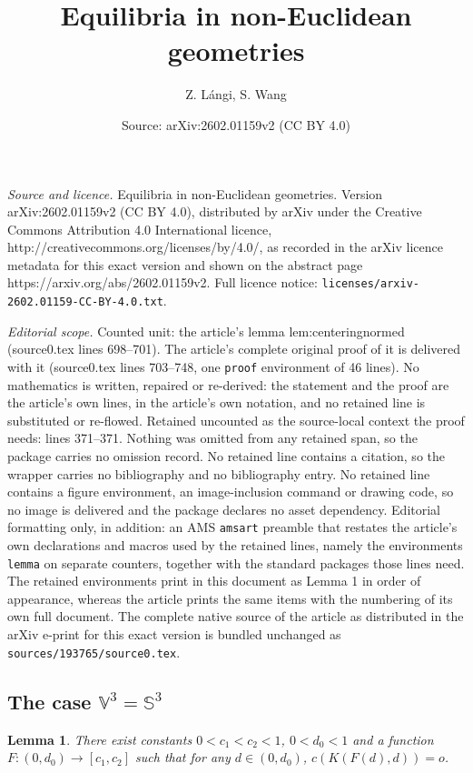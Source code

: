 \documentclass[10pt,a4paper]{amsart}
\title{Equilibria in non-Euclidean geometries}
\author{Z. L\'angi, S. Wang}
\date{Source: arXiv:2602.01159v2 (CC BY 4.0)}
\newtheorem{lemma}{Lemma}
\newcommand{\Sph}{\mathbb{S}}
\newcommand{\V}{\mathbb{V}}
\begin{document}
\maketitle

\noindent\emph{Source and licence.} Equilibria in non-Euclidean geometries. Version arXiv:2602.01159v2 (CC BY 4.0), distributed by arXiv under the Creative Commons Attribution 4.0 International licence, http://creativecommons.org/licenses/by/4.0/, as recorded in the arXiv licence metadata for this exact version and shown on the abstract page https://arxiv.org/abs/2602.01159v2. Full licence notice: \texttt{licenses/arxiv-2602.01159-CC-BY-4.0.txt}.\par\smallskip

\noindent\textit{Editorial scope.} Counted unit: the article's lemma lem:centeringnormed (source0.tex lines 698--701). The article's complete original proof of it is delivered with it (source0.tex lines 703--748, one \texttt{proof} environment of 46 lines). No mathematics is written, repaired or re-derived: the statement and the proof are the article's own lines, in the article's own notation, and no retained line is substituted or re-flowed.  Retained uncounted as the source-local context the proof needs: lines 371--371.  Nothing was omitted from any retained span, so the package carries no omission record.  No retained line contains a citation, so the wrapper carries no bibliography and no bibliography entry.  No retained line contains a figure environment, an image-inclusion command or drawing code, so no image is delivered and the package declares no asset dependency.  Editorial formatting only, in addition: an AMS \texttt{amsart} preamble that restates the article's own declarations and macros used by the retained lines, namely the environments \texttt{lemma} on separate counters, together with the standard packages those lines need.  The retained environments print in this document as Lemma 1 in order of appearance, whereas the article prints the same items with the numbering of its own full document.  The complete native source of the article as distributed in the arXiv e-print for this exact version is bundled unchanged as \texttt{sources/193765/source0.tex}.
\subsection{The case $\V^3 = \Sph^3$}\label{subsec:spherical}

\begin{lemma}\label{lem:centeringnormed}
There exist constants $0 < c_1 < c_2 < 1$, $0 < d_0 < 1$ and a function $F:(0,d_0) \to [c_1,c_2]$ such that for any $d \in (0,d_0)$,
$c(K(F(d),d))=o$.
\end{lemma}
\end{document}

